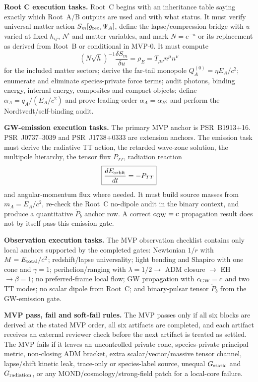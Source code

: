 \documentclass[11pt]{article}
\begin{document}
\medskip\noindent\textbf{Root C execution tasks.}
Root~C begins with an inheritance table saying exactly which Root~A/B outputs
are used and with what status.  It must verify universal matter action
\(S_m[g_{\rm rec},\Psi_A]\), define the lapse/compression bridge with \(u\)
varied at fixed \(h_{ij}\), \(N^i\) and matter variables, and mark
\(N=e^{-u}\) or its replacement as derived from Root~B or conditional in
MVP-0.  It must compute
\[
\boxed{
(N\sqrt h)^{-1}\frac{\delta S_m}{\delta u}
  =\rho_E=T_{\mu\nu}n^\mu n^\nu
}
\]
for the included matter sectors; derive the far-tail monopole
\(Q_A^{(0)}=\eta E_A/c^2\); enumerate and eliminate species-private force
terms; audit photons, binding energy, internal energy, composites and compact
objects; define \(\alpha_A=q_A/(E_A/c^2)\) and prove leading-order
\(\alpha_A=\alpha_B\); and perform the Nordtvedt/self-binding audit.

\medskip\noindent\textbf{GW-emission execution tasks.}
The primary MVP anchor is PSR~B1913+16.  PSR~J0737--3039 and
PSR~J1738+0333 are extension anchors.  The emission task must derive the
radiative TT action, the retarded wave-zone solution, the multipole hierarchy,
the tensor flux \(P_{TT}\), radiation reaction
\[
\boxed{\frac{dE_{\rm orbit}}{dt}=-P_{TT}}
\]
and angular-momentum flux where needed.  It must build source masses from
\(m_A=E_A/c^2\), re-check the Root~C no-dipole audit in the binary context,
and produce a quantitative \(\dot P_b\) anchor row.  A correct
\(c_{\rm GW}=c\) propagation result does not by itself pass this emission
gate.

\medskip\noindent\textbf{Observation execution tasks.}
The MVP observation checklist contains only local anchors supported by the
completed gates: Newtonian \(1/r\) with \(M=E_{\rm total}/c^2\);
redshift/lapse universality; light bending and Shapiro with one cone and
\(\gamma=1\); perihelion/ranging with
\(\lambda=1/2\to\) ADM closure \(\to\) EH \(\to\beta=1\); no preferred-frame
local flow; GW propagation with \(c_{\rm GW}=c\) and two TT modes; no scalar
dipole from Root~C; and binary-pulsar tensor \(\dot P_b\) from the
GW-emission gate.

\medskip\noindent\textbf{MVP pass, fail and soft-fail rules.}
The MVP passes only if all six blocks are derived at the stated MVP order, all
six artifacts are completed, and each artifact receives an external reviewer
check before the next artifact is treated as settled.  The MVP fails if it
leaves an uncontrolled private cone, species-private principal metric,
non-closing ADM bracket, extra scalar/vector/massive tensor channel,
lapse/shift kinetic leak, trace-only or species-label source, unequal
\(G_{\rm static}\) and \(G_{\rm radiation}\), or any MOND/cosmology/strong-field
patch for a local-core failure.
\end{document}
